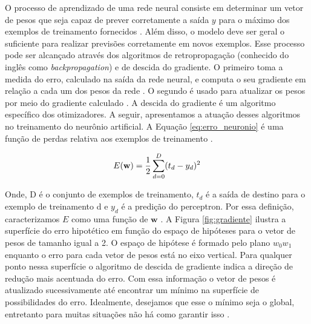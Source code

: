
O processo de aprendizado de uma rede neural consiste em determinar um vetor de pesos que seja capaz de prever corretamente a saída $y$ para o máximo dos exemplos de treinamento fornecidos \cite{Mitchell}. Além disso, o modelo deve ser geral o suficiente para realizar previsões corretamente em novos exemplos. 
Esse processo pode ser alcançado através dos algoritmos de retropropagação (conhecido do  inglês como \textit{backpropagation}) \cite{rumelhart1988learning, Goodfellow2016} e de descida do gradiente. O primeiro toma a medida do erro, calculado na saída da rede neural, e computa o seu gradiente em relação a cada um dos pesos da rede \cite{Goodfellow2016}. O segundo é usado para atualizar os pesos por meio do gradiente calculado  \cite{Mitchell}.  A descida do gradiente é um algoritmo específico dos otimizadores.  
A seguir, apresentamos a atuação desses algoritmos no treinamento do neurônio artificial.  A Equação \ref{eq:erro_neuronio} é uma função de perdas relativa aos exemplos de treinamento \cite{Mitchell}.

\begin{equation}
\label{eq:erro_neuronio}
\begin{aligned}
\centering    
E(\textbf{w}) = \displaystyle \frac{1}{2}\sum_{d=0}^{D}( t_{d} - y_{d})^{2}  
\end{aligned}
\end{equation}

Onde, D é o conjunto de exemplos de treinamento, $t_{d}$ é a saída de destino para o exemplo de treinamento d e $y_{d}$ é a predição do perceptron. Por essa definição, caracterizamos $E$ como uma função de $\textbf{w}$ \cite{Mitchell}.
A Figura \ref{fig:gradiente} ilustra a superfície do erro hipotético em função do espaço de hipóteses para o vetor de pesos de tamanho igual a 2. O espaço de hipótese é formado pelo plano $w_0w_1$ enquanto o erro para cada vetor de pesos está no eixo vertical. Para qualquer ponto nessa superfície o algoritmo de descida de gradiente indica a direção de redução mais acentuada do erro. Com essa informação o vetor de pesos é atualizado sucessivamente até encontrar um mínimo na superfície de possibilidades do erro. Idealmente, desejamos que esse o mínimo seja o global, entretanto para muitas situações não há como garantir isso \cite{Mitchell}. 

